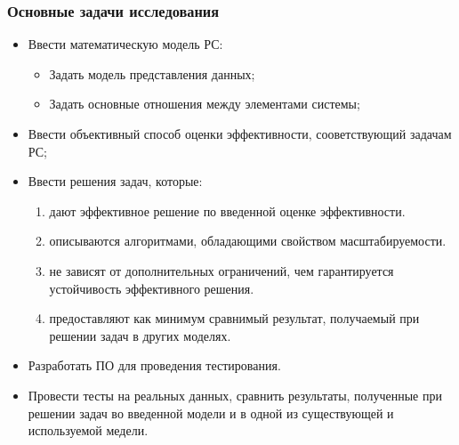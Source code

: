 \documentclass[10pt,xcolor={usenames,dvipsnames}]{beamer}
\theoremstyle{break}
\begin{document}
\begin{frame}
  \frametitle{Основные задачи исследования}
\begin{itemize}
\item Ввести математическую модель РС:
  \begin{itemize}
    \item Задать модель представления данных;
    \item Задать основные отношения между элементами системы;
  \end{itemize}
\item Ввести объективный способ оценки эффективности, сооветствующий задачам РС;
\item Ввести решения задач, которые:
  \begin{enumerate}
  \item дают эффективное решение по введенной оценке эффективности.
  \item описываются алгоритмами, обладающими свойством масштабируемости.
  \item не зависят от дополнительных ограничений, чем гарантируется устойчивость эффективного решения.
  \item предоставляют как минимум сравнимый результат, получаемый при решении задач в других моделях.
  \end{enumerate}
\item Разработать ПО для проведения тестирования.
\item Провести тесты на реальных данных, сравнить результаты, полученные при решении задач во введенной модели и
в одной из существующей и используемой медели.
\end{itemize}
\end{frame}


\end{document}
